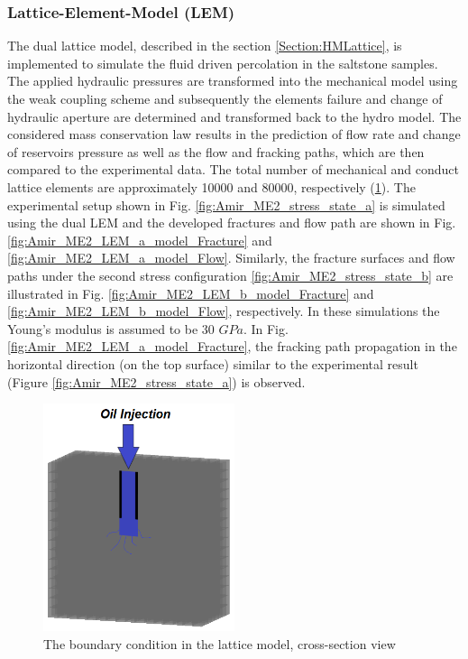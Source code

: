 \subsubsection*{Lattice-Element-Model (LEM)}

The dual lattice model, described in the section \ref{Section:HMLattice}, is implemented to simulate the fluid driven percolation in the saltstone samples. The applied hydraulic pressures are transformed into the mechanical model using the weak coupling scheme and subsequently the elements failure and change of hydraulic aperture are determined and transformed back to the hydro model. The considered mass conservation law results in the prediction of flow rate and change of reservoirs pressure as well as the flow and fracking paths, which are then compared to the experimental data. The total number of mechanical and conduct lattice elements are approximately 10000 and 80000, respectively (\ref{fig:Amir_ME2_LEM_a_model}).  The experimental setup shown in Fig. \ref{fig:Amir_ME2_stress_state_a} is simulated using  the dual LEM and the developed fractures and flow path are shown in Fig. \ref{fig:Amir_ME2_LEM_a_model_Fracture} and \ref{fig:Amir_ME2_LEM_a_model_Flow}. Similarly, the fracture surfaces and flow paths under the second stress configuration \ref{fig:Amir_ME2_stress_state_b} are illustrated in Fig. \ref{fig:Amir_ME2_LEM_b_model_Fracture} and \ref{fig:Amir_ME2_LEM_b_model_Flow}, respectively. In these simulations the Young's modulus is assumed to be 30 $GPa$. In Fig. \ref{fig:Amir_ME2_LEM_a_model_Fracture}, the fracking path propagation in the horizontal direction (on the top surface) similar to the experimental result (Figure \ref{fig:Amir_ME2_stress_state_a}) is observed. 

\begin{figure}[!ht]
\centering
\includegraphics[width=0.5\textwidth]{figures/Amir_ME2_LEM_a_model.png}
\caption{The boundary condition in the lattice model, cross-section view}
\label{fig:Amir_ME2_LEM_a_model}
\end{figure}


